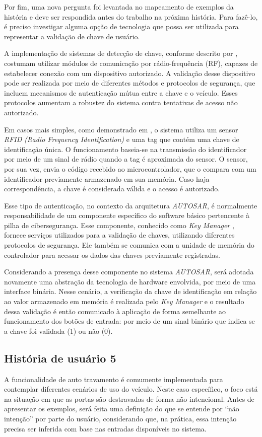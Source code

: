 Por fim, uma nova pergunta foi levantada no mapeamento de exemplos da história e deve ser respondida antes do trabalho na próxima história. Para fazê-lo, é 
preciso investigar alguma opção de tecnologia que possa ser utilizada para representar a validação de chave de usuário. 

A implementação de sistemas de detecção de chave, conforme descrito por , costumam utilizar módulos de comunicação por rádio-frequência (RF), 
capazes de estabelecer conexão com um dispositivo autorizado. A validação desse dispositivo pode ser realizada por meio de diferentes métodos e protocolos de segurança, 
que incluem mecanismos de autenticação mútua entre a chave e o veículo. Esses protocolos aumentam a robustez do sistema contra tentativas de acesso não autorizado.

Em casos mais simples, como demonstrado em , o sistema utiliza um sensor \textit{RFID (Radio Frequency Identification)} e uma tag que contém uma chave 
de identificação única. O funcionamento baseia-se na transmissão do identificador por meio de um sinal de rádio quando a tag é aproximada do sensor. O sensor, 
por sua vez, envia o código recebido ao microcontrolador, que o compara com um identificador previamente armazenado em sua memória. Caso haja correspondência, 
a chave é considerada válida e o acesso é autorizado.

Esse tipo de autenticação, no contexto da arquitetura \textit{AUTOSAR}, é normalmente responsabilidade de um componente específico do software básico pertencente 
à pilha de cibersegurança. Esse componente, conhecido como \textit{Key Manager} \cite{autosarKeyManager}, fornece serviços utilizados para a validação de chaves, 
utilizando diferentes protocolos de segurança. Ele também se comunica com a unidade de memória do controlador para acessar os dados das chaves previamente registradas.

Considerando a presença desse componente no sistema \textit{AUTOSAR}, será adotada novamente uma abstração da tecnologia de hardware envolvida, por meio de uma interface 
binária. Nesse cenário, a verificação da chave de identificação em relação ao valor armazenado em memória é realizada pelo \textit{Key Manager} e o resultado dessa 
validação é então comunicado à aplicação de forma semelhante ao funcionamento dos botões de entrada: por meio de um sinal binário que indica se a chave foi 
validada (1) ou não (0).

\subsection{História de usuário 5}
A funcionalidade de auto travamento é comumente implementada para contemplar diferentes cenários de uso do veículo. Neste caso específico, o foco está na situação em 
que as portas são destravadas de forma não intencional. Antes de apresentar os exemplos, será feita uma definição do que se entende por ``não intenção'' por parte do 
usuário, considerando que, na prática, essa intenção precisa ser inferida com base nas entradas disponíveis no sistema. 

